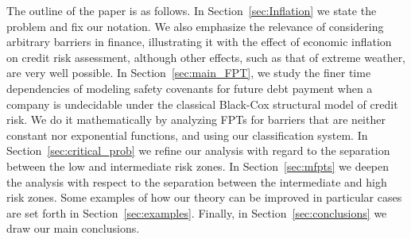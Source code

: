 \documentclass[12pt]{article}
\theoremstyle{definition}
\begin{document}

The outline of the paper is as follows. In  Section~\ref{sec:Inflation} we state the problem and fix our notation. We also emphasize the relevance of considering arbitrary barriers in finance, illustrating it with the effect of economic inflation on credit risk assessment, although other effects, such as that of extreme weather, are very well possible. In Section~\ref{sec:main_FPT}, we study the finer time dependencies of modeling safety covenants for future debt payment when a company is undecidable under the classical Black-Cox structural model of credit risk. We do it mathematically by analyzing FPTs for barriers that are neither constant nor exponential functions, and using our classification system. In Section~\ref{sec:critical_prob} we refine our analysis with regard to the separation between the low and intermediate risk zones. In Section~\ref{sec:mfpts} we deepen the analysis with respect to the separation between the intermediate and high risk zones. Some examples of how our theory can be improved in particular cases are set forth in Section~\ref{sec:examples}. Finally, in Section~\ref{sec:conclusions} we draw our main conclusions.
\end{document}
